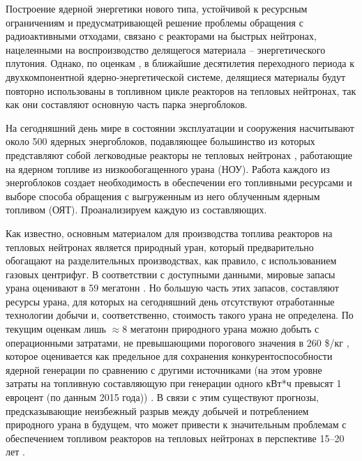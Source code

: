 {\actuality}

Построение ядерной энергетики нового типа, устойчивой к ресурсным ограничениям и предусматривающей решение проблемы обращения с радиоактивными отходами, связано с реакторами на быстрых нейтронах, нацеленными на воспроизводство делящегося материала -- энергетического  плутония. Однако, по оценкам \cite{andrianovaPerspektivnyeToplivnyeZagruzki2015}, в ближайшие десятилетия переходного периода к двухкомпонентной ядерно-энергетической системе, делящиеся материалы будут повторно использованы в топливном цикле реакторов на тепловых нейтронах, так как они составляют основную часть парка энергоблоков.

На сегодняшний день мире в состоянии эксплуатации и сооружения насчитывают около 500 ядерных энергоблоков, подавляющее большинство из которых представляют собой легководные реакторы не тепловых нейтронах \cite{PRISHome}, работающие на ядерном топливе из низкообогащенного урана (НОУ). Работа каждого из энергоблоков создает необходимость в обеспечении его топливными ресурсами и выборе способа обращения с выгруженным из него облученным ядерным топливом (ОЯТ). Проанализируем каждую из составляющих. 

Как известно, основным материалом для производства топлива реакторов на тепловых нейтронах является природный уран, который предварительно обогащают на разделительных производствах, как правило, с использованием газовых центрифуг. В соответствии с доступными данными, мировые запасы урана  оценивают в 59 мегатонн \cite{/content/publication/d82388ab-en}. Но большую часть этих запасов, составляют ресурсы урана, для которых на сегодняшний день отсутствуют отработанные технологии добычи и, соответственно, стоимость такого урана не определена. По текущим оценкам лишь $\approx$8 мегатонн природного урана можно добыть с операционными затратами, не превышающими порогового значения в 260 \$/кг \cite{WorldDistributionUranium2018}, которое оценивается как предельное для сохранения конкурентоспособности ядерной генерации по сравнению с другими источниками (на этом уровне затраты на топливную составляющую при генерации одного кВт*ч превысят 1 евроцент (по данным 2015 года)) \cite{hartardCompetitionConflictsResource2015}. В связи с этим существуют прогнозы, предсказывающие неизбежный разрыв между добычей и потреблением природного урана в будущем, что может привести к значительным проблемам  с обеспечением топливом реакторов на тепловых нейтронах в перспективе 15--20 лет \cite{international2019iaea}.

